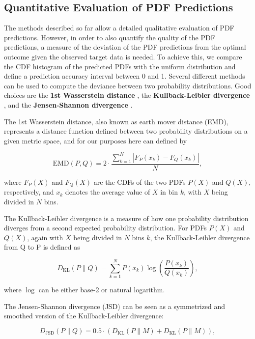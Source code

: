 \documentclass[BCOR=1mm, DIV=calc,10pt,
twoside=true,
twocolumn,
headings=normal]{scrartcl}
\begin{document}
\subsection{Quantitative Evaluation of PDF Predictions}

The methods described so far allow a detailed qualitative evaluation of PDF predictions. However, in order to also quantify the quality of the PDF predictions, a measure of the deviation of the PDF predictions from the optimal outcome given the observed target data is needed. To achieve this, we compare the CDF histogram of the predicted PDFs with the uniform distribution and define a prediction accuracy interval between 0 and 1. Several different methods can be used to compute the deviance between two probability distributions. Good choices are the \textbf{1st Wasserstein distance} \cite{olkin1982}, the \textbf{Kullback-Leibler divergence} \cite{kullback1951}, and the \textbf{Jensen-Shannon divergence}  \cite{dagan1997}.

The 1st Wasserstein distance, also known as earth mover distance (EMD), represents a distance function defined between two probability distributions on a given metric space, and for our purposes here can defined by

\begin{equation}
\text{EMD}(P, Q) = 2 \cdot \frac{\sum_{k=1}^N |F_P(x_k) - F_Q(x_k)|}{N},
\end{equation}

where $F_P(X)$ and $F_Q(X)$ are the CDFs of the two PDFs $P(X)$ and $Q(X)$, respectively, and $x_k$ denotes the average value of $X$ in bin $k$, with $X$ being divided in $N$ bins.

The Kullback-Leibler divergence is a measure of how one probability distribution diverges from a second expected probability distribution. For PDFs $P(X)$ and $Q(X)$, again with $X$ being divided in $N$ bins $k$, the Kullback-Leibler divergence from Q to P is defined as

\begin{equation}
D_{\text{KL}}(P \parallel Q) = \sum _{k=1}^N P(x_k) \log \left({\frac{P(x_k)}{Q(x_k)}}\right),
\end{equation}

where $\log$ can be either base-2 or natural logarithm.

The Jensen-Shannon divergence (JSD) can be seen as a symmetrized and smoothed version of the Kullback-Leibler divergence:

\begin{equation}
D_{\text{JSD}}(P \parallel Q) = 0.5  \cdot (D_{\text{KL}}(P \parallel M) + D_{\text{KL}}(P \parallel M)),
\end{equation}
\end{document}
